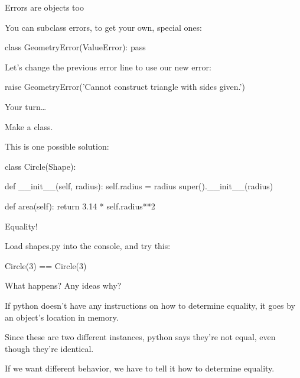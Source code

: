 \documentclass[aspectratio=169] {beamer}
\begin{document}
\begin{frame}[fragile]{Errors are objects too}

  You can subclass errors, to get your own, special ones: \pause
  \begin{pythoncode}
    class GeometryError(ValueError):
        pass
  \end{pythoncode}
  
  \medskip \pause
  
  Let's change the previous error line to use our new error:
  
  \begin{smallpythoncode}
    raise GeometryError('Cannot construct triangle with sides given.')
  \end{smallpythoncode}
  



\end{frame}

\begin{frame}[fragile]{Your turn\dots}

  Make a  class.
  
  \medskip\pause
  
  This is one possible solution:
      \begin{pythoncode}
        class Circle(Shape):
  
            def __init__(self, radius):
                self.radius = radius
                super().__init__(radius)
    
            def area(self):
                return 3.14 * self.radius**2
      \end{pythoncode}


\end{frame}


\begin{frame}[fragile]{Equality!}

  Load shapes.py into the console, and try this:
  
  \begin{pythoncode}
    Circle(3) == Circle(3)
  \end{pythoncode}
  \pause
  What happens? Any ideas why?
  
  \medskip\pause
  
  If python doesn't have any instructions on how to determine equality,
  it goes by an object's location in memory.  
  
  \medskip
  
  Since these are two different instances, python says they're not equal,
  even though they're identical.
  
  \medskip
  
  If we want different behavior, we have to tell it how to determine equality.


\end{frame}
\end{document}
